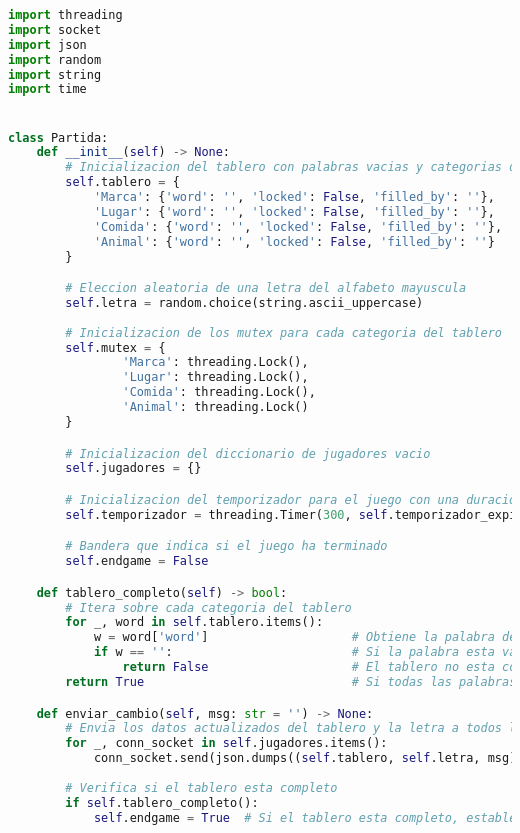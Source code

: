 \documentclass{article}
\begin{document}
\begin{lstlisting}[language=Python, caption={Código Python}, label={lst:python_code.}]
import threading
import socket
import json
import random
import string
import time


class Partida:
    def __init__(self) -> None:
        # Inicializacion del tablero con palabras vacias y categorias desbloqueadas
        self.tablero = {
            'Marca': {'word': '', 'locked': False, 'filled_by': ''},
            'Lugar': {'word': '', 'locked': False, 'filled_by': ''},
            'Comida': {'word': '', 'locked': False, 'filled_by': ''},
            'Animal': {'word': '', 'locked': False, 'filled_by': ''}
        }

        # Eleccion aleatoria de una letra del alfabeto mayuscula
        self.letra = random.choice(string.ascii_uppercase)
            
        # Inicializacion de los mutex para cada categoria del tablero
        self.mutex = {
                'Marca': threading.Lock(),
                'Lugar': threading.Lock(),
                'Comida': threading.Lock(),
                'Animal': threading.Lock()
        }

        # Inicializacion del diccionario de jugadores vacio
        self.jugadores = {}

        # Inicializacion del temporizador para el juego con una duracion de 300 segundos (5 minutos)
        self.temporizador = threading.Timer(300, self.temporizador_expirado)

        # Bandera que indica si el juego ha terminado
        self.endgame = False

    def tablero_completo(self) -> bool:
        # Itera sobre cada categoria del tablero
        for _, word in self.tablero.items():
            w = word['word']                    # Obtiene la palabra de la categoria
            if w == '':                         # Si la palabra esta vacia
                return False                    # El tablero no esta completo
        return True                             # Si todas las palabras estan llenas, el tablero esta completo

    def enviar_cambio(self, msg: str = '') -> None:
        # Envia los datos actualizados del tablero y la letra a todos los jugadores
        for _, conn_socket in self.jugadores.items():
            conn_socket.send(json.dumps((self.tablero, self.letra, msg)).encode())
        
        # Verifica si el tablero esta completo
        if self.tablero_completo():
            self.endgame = True  # Si el tablero esta completo, establece la bandera de fin de juego


\end{lstlisting}
\end{document}
